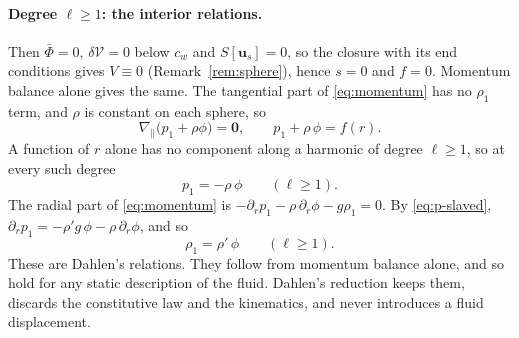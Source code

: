 \documentclass[11pt]{article}
\theoremstyle{definition}
\theoremstyle{remark}
\newcommand{\bu}{\mathbf{u}}
\newcommand{\Vol}{\mathcal V}
\begin{document}
\paragraph{Degree $\ell \ge 1$: the interior relations.} Then
$\bar\Phi = 0$, $\delta\Vol = 0$ below $c_w$ and $S[\bu_s] = 0$, so the
closure with its end conditions gives $V \equiv 0$
(Remark~\ref{rem:sphere}), hence $s = 0$ and $f = 0$. Momentum balance
alone gives the same. The tangential part of \eqref{eq:momentum} has no
$\rho_1$ term, and $\rho$ is constant on each sphere, so
\begin{equation}
  \nabla_{\!\parallel}\bigl(p_1 + \rho\phi\bigr) = \mathbf 0,
  \qquad
  p_1 + \rho\,\phi = f(r) .
  \label{eq:tangential}
\end{equation}
A function of $r$ alone has no component along a harmonic of degree
$\ell \ge 1$, so at every such degree
\begin{equation}
  p_1 = -\rho\,\phi \qquad (\ell \ge 1).
  \label{eq:p-slaved}
\end{equation}
The radial part of \eqref{eq:momentum} is $-\partial_rp_1 -
\rho\,\partial_r\phi - g\rho_1 = 0$. By \eqref{eq:p-slaved},
$\partial_rp_1 = -\rho' g\,\phi - \rho\,\partial_r\phi$, and so
\begin{equation}
  \rho_1 = \rho'\,\phi \qquad (\ell \ge 1).
  \label{eq:rho-slaved}
\end{equation}
These are Dahlen's relations. They follow from momentum balance alone,
and so hold for any static description of the fluid. Dahlen's
reduction keeps them, discards the constitutive law and the
kinematics, and never introduces a fluid displacement.
\end{document}
